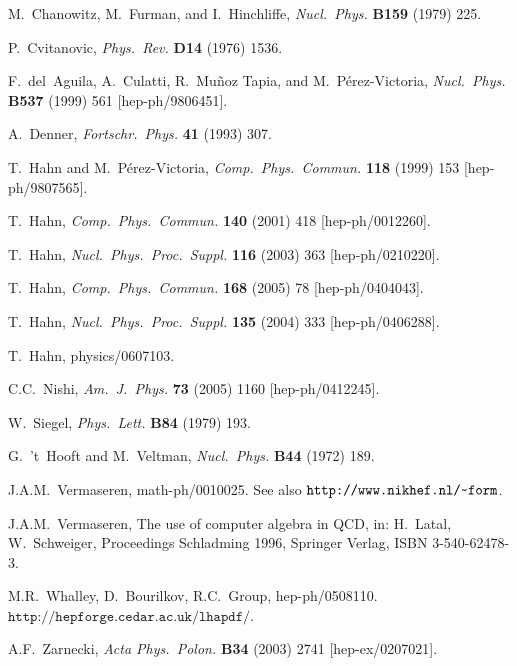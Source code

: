 \documentclass[twoside,11pt]{article}
\def\Code#1{\ensuremath{\texttt{#1}}}
\def\home{\symbol{126}}
\begin{document}
\pagebreak

\begin{flushleft}
\begin{thebibliography}{999}

\newcommand{\acm}[3]{\textsl{ACM Trans.\ Math.\ Software} \textbf{#1} (#2) #3}
\newcommand{\ajp}[3]{\textsl{Am.\ J.\ Phys.} \textbf{#1} (#2) #3}
\newcommand{\app}[3]{\textsl{Acta Phys.\ Polon.} \textbf{#1} (#2) #3}
\newcommand{\cpc}[3]{\textsl{Comp.\ Phys.\ Commun.} \textbf{#1} (#2) #3}
\newcommand{\fp}[3]{\textsl{Fortschr.\ Phys.} \textbf{#1} (#2) #3}
\newcommand{\np}[3]{\textsl{Nucl.\ Phys.} \textbf{#1} (#2) #3}
\newcommand{\npps}[3]{\textsl{Nucl.\ Phys.\ Proc.\ Suppl.} \textbf{#1} (#2) #3}
\newcommand{\pl}[3]{\textsl{Phys.\ Lett.} \textbf{#1} (#2) #3}
\newcommand{\pr}[3]{\textsl{Phys.\ Rev.} \textbf{#1} (#2) #3}
\newcommand{\prl}[3]{\textsl{Phys.\ Rev.\ Lett.} \textbf{#1} (#2) #3}
\newcommand{\zp}[3]{\textsl{Z.\ Phys.} \textbf{#1} (#2) #3}

M.~Chanowitz, M.~Furman, and I.~Hinchliffe, \np{B159}{1979}{225}.

P.~Cvitanovic, \pr{D14}{1976}{1536}.

F.~del~Aguila, A.~Culatti, R.~Mu\~noz Tapia, and M.~P\'erez-Victoria,
\np{B537}{1999}{561} [hep-ph/9806451].

A.~Denner, \fp{41}{1993}{307}.

T.~Hahn and M.~P\'erez-Victoria, \cpc{118}{1999}{153} [hep-ph/9807565].

T.~Hahn, \cpc{140}{2001}{418} [hep-ph/0012260].

T.~Hahn, \npps{116}{2003}{363} [hep-ph/0210220].

T.~Hahn, \cpc{168}{2005}{78} [hep-ph/0404043].

T.~Hahn, \npps{135}{2004}{333} [hep-ph/0406288].

T.~Hahn, physics/0607103.

C.C.~Nishi, \ajp{73}{2005}{1160} [hep-ph/0412245].

W.~Siegel, \pl{B84}{1979}{193}.

G.~'t~Hooft and M.~Veltman, \np{B44}{1972}{189}.

J.A.M.~Vermaseren, math-ph/0010025.
See also \Code{http://www.nikhef.nl/\home form}.

J.A.M.~Vermaseren, The use of computer algebra in QCD, in: H.~Latal, 
W.~Schweiger, Proceedings Schladming 1996, Springer Verlag, ISBN
3-540-62478-3.

M.R.~Whalley, D.~Bourilkov, R.C.~Group, hep-ph/0508110.
\Code{http://hepforge.cedar.ac.uk/lhapdf/}.

A.F.~Zarnecki, \app{B34}{2003}{2741} [hep-ex/0207021].

\end{thebibliography}
\end{flushleft}
\end{document}
